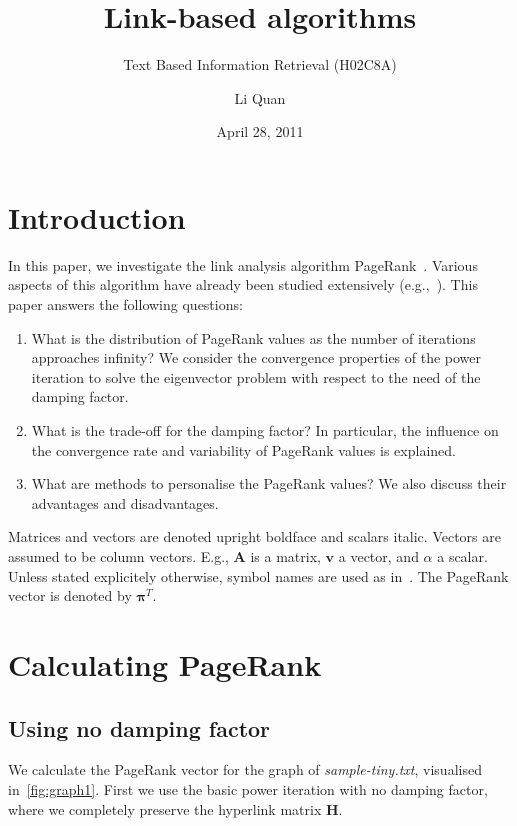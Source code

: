 \documentclass[a4paper,english,11pt]{scrartcl}
\title{Link-based algorithms}
\subtitle{Text Based Information Retrieval (H02C8A)}
\author{Li Quan}
\date{April 28, 2011}
\renewcommand{\vec}[1]{\mathbf{#1}}
\begin{document}
\maketitle

\tableofcontents

\clearpage
\section{Introduction}
In this paper, we investigate the link analysis algorithm PageRank~\cite{pap,Page1998}. Various aspects of this algorithm have already been studied extensively (e.g.,~\cite{function,Bryan,fiddling,deeper,Langville:2006:GPB:1146372}). This paper answers the following questions:
\begin{enumerate}
 \item What is the distribution of PageRank values as the number of iterations approaches infinity? We consider the convergence properties of the power iteration to solve the eigenvector problem with respect to the need of the damping factor.
 \item What is the trade-off for the damping factor? In particular, the influence on the convergence rate and variability of PageRank values is explained.
 \item What are methods to personalise the PageRank values? We also discuss their advantages and disadvantages.
\end{enumerate}

\begin{notation}
Matrices and vectors are denoted upright boldface and scalars italic. 
Vectors are assumed to be column vectors.
E.g., $\vec{A}$ is a matrix, $\vec{v}$ a vector, and $\alpha$ a scalar.
Unless stated explicitely otherwise, symbol names are used as in~\cite{ams}. The PageRank vector is denoted by $\boldsymbol{\pi}^T$.
\end{notation}

\section{Calculating PageRank}
% 

\subsection{Using no damping factor}
We calculate the PageRank vector for the graph of \emph{sample-tiny.txt}, visualised in~\autoref{fig:graph1}. First we use the basic power iteration with no damping factor, where we completely preserve the hyperlink matrix $\vec{H}$.
\end{document}
